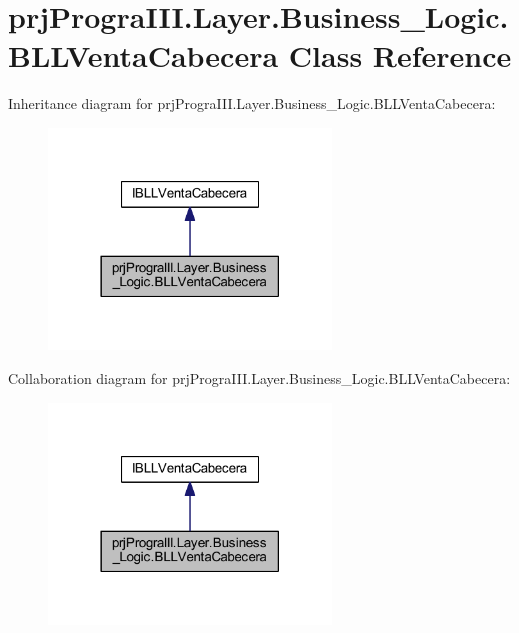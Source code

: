 \hypertarget{classprj_progra_i_i_i_1_1_layer_1_1_business___logic_1_1_b_l_l_venta_cabecera}{}\section{prj\+Progra\+I\+I\+I.\+Layer.\+Business\+\_\+\+Logic.\+B\+L\+L\+Venta\+Cabecera Class Reference}
\label{classprj_progra_i_i_i_1_1_layer_1_1_business___logic_1_1_b_l_l_venta_cabecera}


Inheritance diagram for prj\+Progra\+I\+I\+I.\+Layer.\+Business\+\_\+\+Logic.\+B\+L\+L\+Venta\+Cabecera\+:
\nopagebreak
\begin{figure}[H]
\begin{center}
\leavevmode
\includegraphics[width=213pt]{classprj_progra_i_i_i_1_1_layer_1_1_business___logic_1_1_b_l_l_venta_cabecera__inherit__graph}
\end{center}
\end{figure}


Collaboration diagram for prj\+Progra\+I\+I\+I.\+Layer.\+Business\+\_\+\+Logic.\+B\+L\+L\+Venta\+Cabecera\+:
\nopagebreak
\begin{figure}[H]
\begin{center}
\leavevmode
\includegraphics[width=213pt]{classprj_progra_i_i_i_1_1_layer_1_1_business___logic_1_1_b_l_l_venta_cabecera__coll__graph}
\end{center}
\end{figure}
